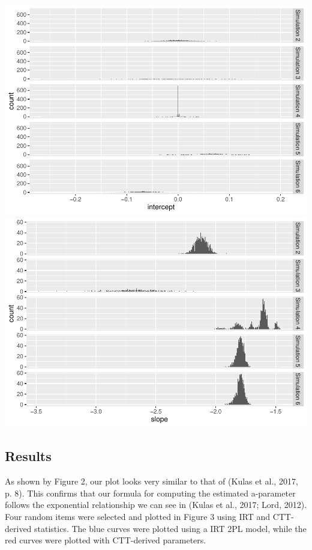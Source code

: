 \documentclass[
  man]{apa6}
\begin{document}
\includegraphics{ICC_project_files/figure-latex/unnamed-chunk-1-1.pdf} \includegraphics{ICC_project_files/figure-latex/unnamed-chunk-1-2.pdf}

\hypertarget{results}{%
\subsection{Results}\label{results}}

As shown by Figure 2, our plot looks very similar to that of (Kulas et al., 2017, p. 8). This confirms that our formula for computing the estimated a-parameter follows the exponential relationship we can see in (Kulas et al., 2017; Lord, 2012). Four random items were selected and plotted in Figure 3 using IRT and CTT-derived statistics. The blue curves were plotted using a IRT 2PL model, while the red curves were plotted with CTT-derived parameters.
\end{document}
